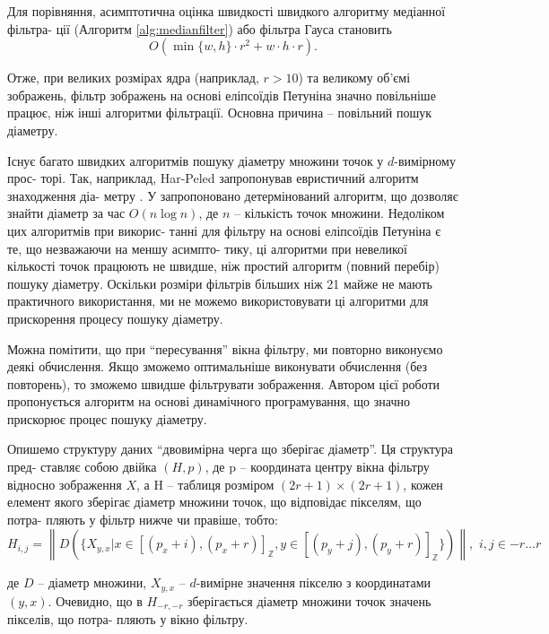 Для порівняння, асимптотична оцінка швидкості швидкого алгоритму медіанної фільтра- ції (Алгоритм \ref{alg:medianfilter}) або фільтра Гауса становить
\begin{equation*}
O\left(
\min\{w, h\} \cdot r^2 + w \cdot h \cdot r
\right).
\end{equation*}

Отже, при великих розмірах ядра (наприклад, \(r > 10\)) та великому об'ємі зображень, фільтр зображень на основі еліпсоїдів Петуніна значно повільніше працює, ніж інші алгоритми фільтрації. Основна причина -- повільний пошук діаметру. 

Існує багато швидких алгоритмів пошуку діаметру множини точок у \(d\)-вимірному прос- торі. Так, наприклад, Har-Peled запропонував евристичний алгоритм знаходження діа- метру \citep{bib:harpeled}. У \citep{bib:diamset} запропоновано детермінований алгоритм, що дозволяє знайти діаметр за час \(O\left( n \log n \right)\), де \(n\) -- кількість точок множини. Недоліком цих алгоритмів при викорис- танні для фільтру на основі еліпсоїдів Петуніна є те, що незважаючи на меншу асимпто- тику, ці алгоритми при невеликої кількості точок працюють не швидше, ніж простий алгоритм (повний перебір) пошуку діаметру. Оскільки розміри фільтрів більших ніж 21 майже не мають практичного використання, ми не можемо використовувати ці алгоритми для прискорення процесу пошуку діаметру.

Можна помітити, що при \enquote{пересування} вікна фільтру, ми повторно виконуємо деякі обчислення. Якщо зможемо оптимальніше виконувати обчислення (без повторень), то зможемо швидше фільтрувати зображення. Автором цієї роботи пропонується алгоритм на основі динамічного програмування, що значно прискорює процес пошуку діаметру.

Опишемо структуру даних \enquote{двовимірна черга що зберігає діаметр}. Ця структура пред- ставляє собою двійка \(\left(H, p\right)\), де p -- координата центру вікна фільтру відносно зображення \(X\), а H -- таблиця розміром \((2r + 1) \times (2r + 1)\), кожен елемент якого зберігає діаметр множини точок, що відповідає пікселям, що потра- пляють у фільтр нижче чи правіше, тобто:
\begin{equation}
\label{eq:queueinit}
H_{i, j} = \left\| D(\{ X_{y, x} \big| x \in [(p_x + i), (p_x + r)]_{\mathbb{Z}}, y \in [(p_y + j), (p_y + r)]_\mathbb{Z} \}) \right\|,\,\, i, j \in -r \dots r
\end{equation}

\par
де \(D\) -- діаметр множини, \(X_{y, x}\) -- \(d\)-вимірне значення пікселю з координатами \((y, x)\). Очевидно, що в \(H_{-r, -r}\) зберігається діаметр множини точок значень пікселів, що потра- пляють у вікно фільтру. 

